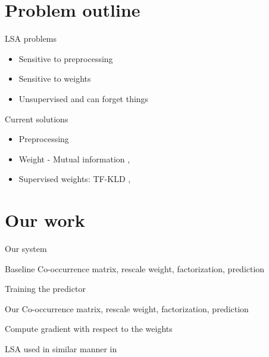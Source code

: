 \documentclass[xcolor={table}]{beamer}
\begin{document}
\section{Problem outline}
\begin{frame}{LSA problems}
    \begin{block}{}
        \begin{itemize}
            \item Sensitive to preprocessing
            \item Sensitive to weights
            \item Unsupervised and can forget things
        \end{itemize}
    \end{block}
\end{frame} 

\begin{frame}{Current solutions}
    \begin{block}{}
        \begin{itemize}
            \item Preprocessing
            \item Weight - Mutual information \cite{wu2017balancing}, \cite{deng2014study}
            \item Supervised weights: TF-KLD \cite{ji2013discriminative}, \cite{lan2009supervised}
        \end{itemize}
    \end{block}
\end{frame} 

\section{Our work}
\begin{frame}{Our system}
    \begin{block}{Baseline}
        Co-occurrence matrix, rescale weight, factorization, prediction
        
        Training the predictor
    \end{block}

    \begin{block}{Our}
        Co-occurrence matrix, rescale weight, factorization, prediction

        Compute gradient with respect to the weights
    \end{block}
    
    LSA used in similar manner in \cite{ionescu2015training}
\end{frame} 
\end{document}
